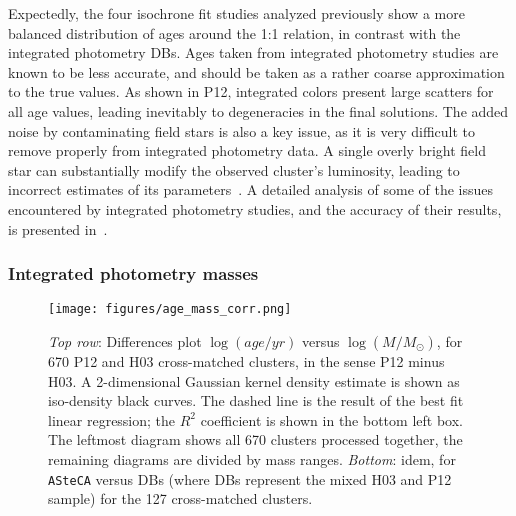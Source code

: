 \documentclass[draft]{aa}
\begin{document}
Expectedly, the four isochrone fit studies analyzed previously show a more
balanced distribution of ages around the 1:1 relation, in contrast with the
integrated photometry DBs. Ages taken from integrated photometry studies are
known to be less accurate, and should be taken as a rather coarse approximation
to the true values.
%
As shown in P12, integrated colors present large scatters for all age values,
leading inevitably to degeneracies in the final solutions.
The added noise by contaminating field stars is also a key issue, as it is
very difficult to remove properly from integrated photometry data. A
single overly bright field star can substantially modify the observed
cluster's luminosity, leading to incorrect estimates of its
parameters~\citep{Baumgardt_2013,Piatti_2014_B88}.
A detailed analysis of some of the issues encountered by integrated photometry
studies, and the accuracy of their results, is presented in~\cite{Anders_2013}.



\subsubsection{Integrated photometry masses}
\label{sssec:integ_photom_masses}
%
%
%
%

\begin{figure*}
\centering
\texttt{[image: figures/age\_mass\_corr.png]}
\caption{\emph{Top row}: Differences plot $\log(age/yr)$ versus
$\log(M/M_{\odot})$, for 670 P12 and H03 cross-matched clusters, in the sense
P12 minus H03.
A 2-dimensional Gaussian kernel density estimate is shown as iso-density black
curves. The dashed line is the result of the best fit linear regression;
the $R^2$ coefficient is shown in the bottom left box.
The leftmost diagram shows all 670 clusters processed together, the remaining
diagrams are divided by mass ranges.
\emph{Bottom}: idem, for \texttt{ASteCA} versus DBs (where DBs represent the
mixed H03 and P12 sample) for the 127 cross-matched clusters.}
\label{fig:age_mass_corr}
\end{figure*}
\end{document}
